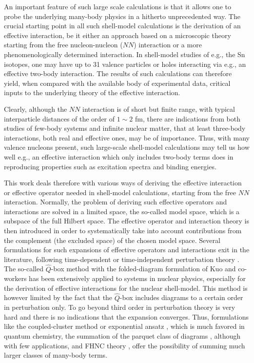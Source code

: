 \documentclass[twoside,12pt]{article}
\begin{document}
An important feature of such large scale calculations
is that it allows one to probe the underlying many-body
physics in a hitherto unprecedented way.
The crucial starting point in all such shell-model
calculations is
the derivation of an effective interaction, be it
either an approach based on a microscopic theory
starting from the free nucleon-nucleon ($NN$) interaction or a more
phenomenologically determined interaction.
In shell-model studies of e.g., the Sn isotopes, one may have
up to 31 valence particles or holes interacting via e.g.,
an effective two-body interaction. The results of such
calculations can therefore yield, when compared with
the available body of experimental data, critical
inputs to the underlying theory of the effective interaction.

Clearly, although the $NN$  interaction is of short
but finite range, with typical interparticle
distances of the order of $1\sim 2$ fm, there are
indications from both studies of few-body systems and
infinite nuclear matter, that at least three-body
interactions, both real and effective ones, may be of
importance.
Thus, with many valence nucleons present, such
large-scale shell-model calculations may
tell us how well e.g., an effective interaction
which only includes two-body terms does in
reproducing properties such as excitation spectra and
binding energies.

This work deals therefore with various ways of
deriving the effective
interaction or effective operator needed
in shell-model calculations, starting from the
free $NN$  interaction.
Normally, the problem of deriving such effective operators and interactions are solved
in a limited space, the so-called model space, which is a subspace of the
full Hilbert space. The effective operator and interaction
theory is then introduced in order to
systematically take into account contributions from the complement
(the excluded space) of the chosen model space. Several formulations
for such expansions of effective operators and interactions exit in the literature, following
time-dependent or time-independent
perturbation theory \cite{so95,brandow67,ko90,hko95,lm85,so84}.
The so-called $\hat{Q}$-box method with the folded-diagram
formulation of Kuo and co-workers \cite{ko90,hko95} has been extensively
applied to systems in nuclear physics, especially for the derivation of
effective interactions for the nuclear shell-model. This method is however limited 
by the fact that the $\hat{Q}$-box includes diagrams to a certain order in perturbation only.
To go beyond third order in perturbation theory is very hard and there is no indications
that the expansion converges. Thus,
formulations like the coupled-cluster
method or exponential ansatz
\cite{lm85,coester58,coester60,bartlett81,comp_chem_rev00,harris92,piotr1,helgaker,arponen97,lk72a,lk72b,zabolitzky74,klz78,ticcm,mh00a,mh00b,mh99,hm99}, which is  much favored
in quantum chemistry,
the summation of the parquet class of diagrams
\cite{dm64,nozieres,babu,jls82,br86,scalapino,ym96,dya97}, although with few applications, and FHNC
theory \cite{br86,adelchi98,apr98}, 
offer the possibility of summing much larger classes of many-body terms. 
\end{document}
